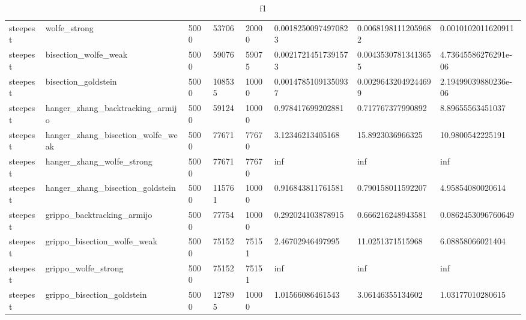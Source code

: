\documentclass[a4paper,11pt]{article}
\numberwithin{equation}{section} %
\begin{document}
\begin{table}[h!]
{\begin{tabular}{|l|l|l|l|l|l|l|l|}
        steepest & wolfe\_strong & 5000 & 53706 & 20000 & 0.00182500974970823 & 0.00681981112059682 & 0.0010102011620911 \\
        steepest & bisection\_wolfe\_weak & 5000 & 59076 & 59075 & 0.00217214517391573 & 0.00435307813413655 & 4.73645586276291e-06 \\
        steepest & bisection\_goldstein & 5000 & 108535 & 10000 & 0.00147851091350937 & 0.00296432049244699 & 2.19499039880236e-06 \\
        steepest & hanger\_zhang\_backtracking\_armijo & 5000 & 59124 & 10000 & 0.978417699202881 & 0.717767377990892 & 8.89655563451037 \\
        steepest & hanger\_zhang\_bisection\_wolfe\_weak & 5000 & 77671 & 77670 & 3.12346213405168 & 15.8923036966325 & 10.9800542225191 \\
        steepest & hanger\_zhang\_wolfe\_strong & 5000 & 77671 & 77670 & inf & inf & inf \\
        steepest & hanger\_zhang\_bisection\_goldstein & 5000 & 115761 & 10000 & 0.916843811761581 & 0.790158011592207 & 4.95854080020614 \\
        steepest & grippo\_backtracking\_armijo & 5000 & 77754 & 10000 & 0.292024103878915 & 0.666216248943581 & 0.0862453096760649 \\
        steepest & grippo\_bisection\_wolfe\_weak & 5000 & 75152 & 75151 & 2.46702946497995 & 11.0251371515968 & 6.08858066021404 \\
        steepest & grippo\_wolfe\_strong & 5000 & 75152 & 75151 & inf & inf & inf \\
        steepest & grippo\_bisection\_goldstein & 5000 & 127895 & 10000 & 1.01566086461543 & 3.06146355134602 & 1.03177010280615 \\
\end{tabular}}
\caption{f1}
\label{table:f1}
\end{table}
\end{document}
